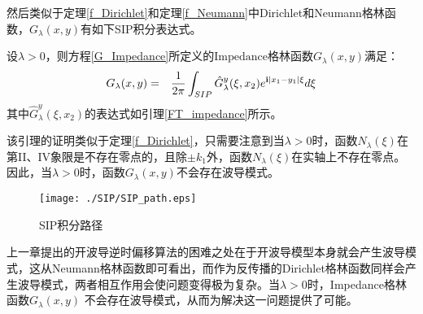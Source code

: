 然后类似于定理\ref{f_Dirichlet}和定理\ref{f_Neumann}中Dirichlet和Neumann格林函数，$G_{\lambda}(x,y)$有如下SIP积分表达式。
\begin{lemma}\label{f_Impedance}
设$\lambda>0$，则方程\eqref{G_Impedance}所定义的$\mathrm{Impedance}$格林函数$G_{\lambda}(x,y)$满足：
\begin{eqnarray}\label{IFT_impedance}
  G_{\lambda}(x,y)&=&\frac{1}{2\pi}\int_{SIP}\hat G^y_{\lambda}(\xi,x_2)e^{\mathbf{i}|x_1-y_1|\xi}d\xi
\end{eqnarray}
其中$\hat G^y_{\lambda}(\xi,x_2)$的表达式如引理\ref{FT_impedance}所示。
\end{lemma}
该引理的证明类似于定理\ref{f_Dirichlet}，只需要注意到当$\lambda>0$时，函数$N_{\lambda}(\xi)$在第II、IV象限是不存在零点的，且除$\pm k_1$外，函数$N_{\lambda}(\xi)$在实轴上不存在零点。因此，当$\lambda>0$时，函数$G_{\lambda}(x,y)$不会存在波导模式。
\begin{figure}
  \centering
  \texttt{[image: ./SIP/SIP\_path.eps]}
  \caption{SIP积分路径}\label{SIP_path3}
\end{figure}


上一章提出的开波导逆时偏移算法的困难之处在于开波导模型本身就会产生波导模式，这从Neumann格林函数即可看出，而作为反传播的Dirichlet格林函数同样会产生波导模式，两者相互作用会使问题变得极为复杂。当$\lambda>0$时，Impedance格林函数$G_{\lambda}(x,y)$ 不会存在波导模式，从而为解决这一问题提供了可能。

